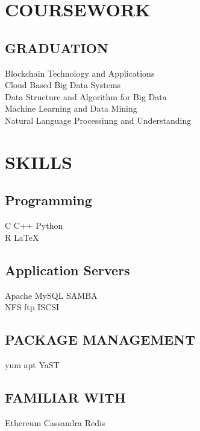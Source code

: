 \documentclass[]{deedy-resume-openfont}
\begin{document}
\begin{minipage}[t]{0.33\textwidth}
\section{COURSEWORK}

\subsection{GRADUATION}
Blockchain Technology and Applications
\\Cloud Based Big Data Systems
\\Data Structure and Algorithm for Big Data
\\Machine Learning and Data Mining
\\Natural Language Processinng and Understanding
\sectionsep


\section{SKILLS}

\subsection{Programming}
C \textbullet{}   C++ \textbullet{} Python \\  R 
 \textbullet{}\LaTeX\ \\ 
\sectionsep
\subsection{Application Servers}
Apache \textbullet{}   MySQL \textbullet{} SAMBA \\  NFS 
 \textbullet{} ftp \textbullet{} ISCSI \\ 
\sectionsep

\subsection{PACKAGE MANAGEMENT}
yum \textbullet{} apt \textbullet{} YaST
\sectionsep
\subsection{FAMILIAR WITH}
Ethereum \textbullet{}Cassandra \textbullet{}Redis
\sectionsep

%
%

\end{minipage} 
\end{document}
